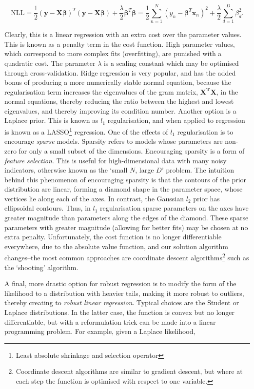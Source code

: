 \documentclass[11pt]{amsart}
\begin{document}
$$\text{NLL} = \frac{1}{2}(\mathbf{y} - \mathbf{X}\boldsymbol\beta)^T(\mathbf{y} - \mathbf{X}\boldsymbol\beta) + \frac{\lambda}{2}\boldsymbol\beta^T\boldsymbol\beta = \frac{1}{2}\sum_{n=1}^N(y_n - \boldsymbol\beta^T\mathbf{x}_n)^2 + \frac{\lambda}{2}\sum_{d=1}^D\beta_d^2.$$

Clearly, this is a linear regression with an extra cost over the parameter values. This is known as a penalty term in the cost function. High parameter values, which correspond to more complex fits (overfitting), are punished with a quadratic cost. The parameter $\lambda$ is a scaling constant which may be optimised through cross-validation. Ridge regression is very popular, and has the added bonus of producing a more numerically stable normal equation, because the regularisation term increases the eigenvalues of the gram matrix, $\mathbf{X^T}\mathbf{X}$, in the normal equations, thereby reducing the ratio between the highest and lowest eigenvalues, and thereby improving its condition number. Another option is a Laplace prior. This is known as $l_1$ regularisation, and when applied to regression is known as a LASSO\footnote{Least absolute shrinkage and selection operator} regression. One of the effects of $l_1$ regularisation is to encourage \emph{sparse} models. Sparsity refers to models whose parameters are non-zero for only a small subset of the dimensions. Encouraging sparsity is a form of \emph{feature selection}. This is useful for high-dimensional data with many noisy indicators, otherwise known as the `small $N$, large $D$' problem. The intuition behind this phenomenon of encouraging sparsity is that the contours of the prior distribution are linear, forming a diamond shape in the parameter space, whose vertices lie along each of the axes. In contrast, the Gaussian $l_2$ prior has ellipsoidal contours. Thus, in $l_1$ regularisation sparse parameters on the axes have greater magnitude than parameters along the edges of the diamond. These sparse parameters with greater magnitude (allowing for better fits) may be chosen at no extra penalty. Unfortunately, the cost function is no longer differentiable everywhere, due to the absolute value function, and our solution algorithm changes--the most common approaches are coordinate descent algorithms\footnote{Coordinate descent algorithms are similar to gradient descent, but where at each step the function is optimised with respect to one variable.} such as the `shooting' algorithm.

A final, more drastic option for robust regression is to modify the form of the likelihood to a distribution with heavier tails, making it more robust to outliers, thereby creating to \emph{robust linear regression}. Typical choices are the Student or Laplace distributions. In the latter case, the function is convex but no longer differentiable, but with a reformulation trick can be made into a linear programming problem. For example, given a Laplace likelihood,
\end{document}
